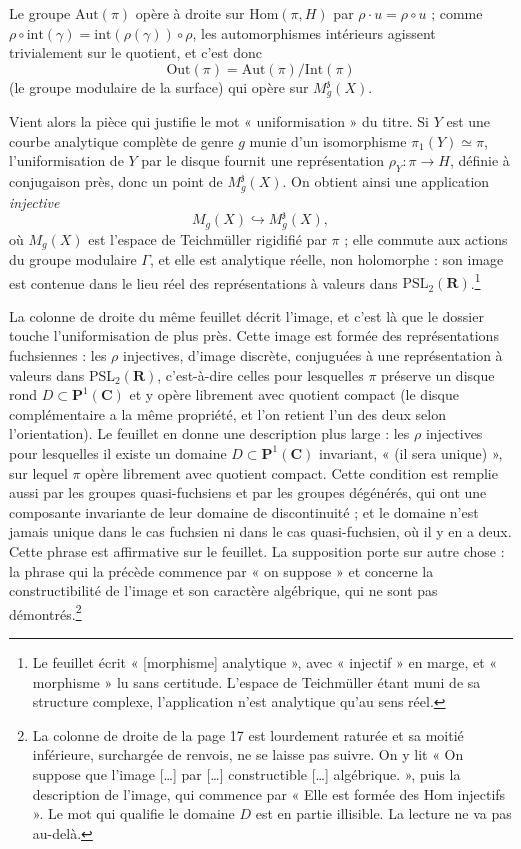 \documentclass[11pt,a4paper]{article}
\begin{document}
Le groupe $\mathrm{Aut}(\pi)$ opère à droite sur $\mathrm{Hom}(\pi,H)$ par
$\rho \cdot u = \rho \circ u$ ; comme $\rho \circ \mathrm{int}(\gamma) =
\mathrm{int}(\rho(\gamma)) \circ \rho$, les automorphismes intérieurs
agissent trivialement sur le quotient, et c'est donc
\[
  \mathrm{Out}(\pi) = \mathrm{Aut}(\pi)/\mathrm{Int}(\pi)
\]
(le groupe modulaire de la surface) qui opère sur
$M_g^{\mathfrak{z}}(X)$.

Vient alors la pièce qui justifie le mot « uniformisation » du titre. Si $Y$
est une courbe analytique complète de genre $g$ munie d'un isomorphisme
$\pi_1(Y) \simeq \pi$, l'uniformisation de $Y$ par le disque fournit une
représentation $\rho_Y : \pi \to H$, définie à conjugaison près, donc un point
de $M_g^{\mathfrak{z}}(X)$. On obtient ainsi une application \emph{injective}
\[
  M_g(X) \hookrightarrow M_g^{\mathfrak{z}}(X),
\]
où $M_g(X)$ est l'espace de Teichmüller rigidifié par $\pi$ ; elle commute
aux actions du groupe modulaire $\Gamma$, et elle est analytique réelle, non
holomorphe : son image est contenue dans le lieu réel des représentations à
valeurs dans $\mathrm{PSL}_2(\mathbf{R})$.\footnote{Le feuillet écrit
« [morphisme] analytique », avec « injectif » en marge, et « morphisme » lu
sans certitude. L'espace de Teichmüller étant muni de sa structure complexe,
l'application n'est analytique qu'au sens réel.}

La colonne de droite du même feuillet décrit l'image, et c'est là que le
dossier touche l'uniformisation de plus près. Cette image est formée des
représentations fuchsiennes : les $\rho$ injectives, d'image discrète,
conjuguées à une représentation à valeurs dans $\mathrm{PSL}_2(\mathbf{R})$,
c'est-à-dire celles pour lesquelles $\pi$ préserve un disque rond
$D \subset \mathbf{P}^1(\mathbf{C})$ et y opère librement avec quotient
compact (le disque complémentaire a la même propriété, et l'on retient l'un
des deux selon l'orientation). Le feuillet en donne une description plus
large : les $\rho$ injectives pour lesquelles il existe un domaine
$D \subset \mathbf{P}^1(\mathbf{C})$ invariant, « (il sera unique) », sur
lequel $\pi$ opère librement avec quotient compact. Cette condition est
remplie aussi par les groupes quasi-fuchsiens et par les groupes dégénérés,
qui ont une composante invariante de leur domaine de discontinuité ; et le
domaine n'est jamais unique dans le cas fuchsien ni dans le cas
quasi-fuchsien, où il y en a deux. Cette phrase est affirmative sur le
feuillet. La supposition porte sur autre chose : la phrase qui la précède
commence par « on suppose » et concerne la constructibilité de l'image et son
caractère algébrique, qui ne sont pas démontrés.\footnote{La colonne de
droite de la page 17 est lourdement raturée et sa moitié inférieure,
surchargée de renvois, ne se laisse pas suivre. On y lit « On suppose que
l'image [\ldots] par [\ldots] constructible [\ldots] algébrique. », puis la
description de l'image, qui commence par « Elle est formée des Hom injectifs ».
Le mot qui qualifie le domaine $D$ est en partie illisible. La lecture ne va
pas au-delà.}
\end{document}
